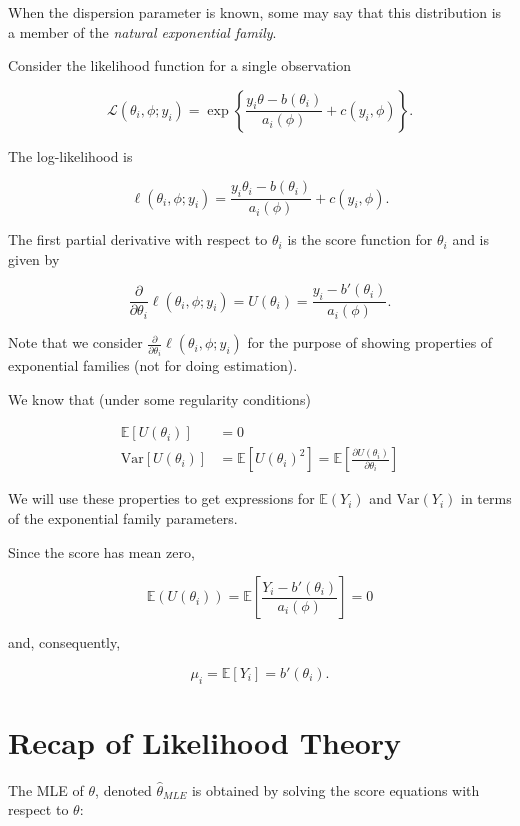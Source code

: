\documentclass[
  letterpaper,
  DIV=11,
  numbers=noendperiod]{scrreport}
\begin{document}
When the dispersion parameter is known, some may say that this
distribution is a member of the \emph{natural exponential family}.

Consider the likelihood function for a single observation

\[\mathcal L(\theta_i, \phi ; y_i) = \exp \left\{ \frac{y_i \theta - b(\theta_i)}{a_i(\phi)} + c(y_i, \phi) \right\}.\]

The log-likelihood is

\[\ell(\theta_i, \phi; y_i) = \frac{y_i \theta_i - b(\theta_i)}{a_i(\phi)} + c(y_i, \phi).\]

The first partial derivative with respect to \(\theta_i\) is the score
function for \(\theta_i\) and is given by

\[\frac{\partial}{\partial \theta_i} \ell (\theta_i, \phi; y_i) = U(\theta_i) = \frac{y_i - b'(\theta_i)}{a_i(\phi)}.\]

Note that we consider
\(\frac{\partial}{\partial \theta_i} \ell (\theta_i, \phi; y_i)\) for
the purpose of showing properties of exponential families (not for doing
estimation).

We know that (under some regularity conditions)

\[
\begin{aligned}
\mathbb E[U(\theta_i)] & = 0 \\ 
\text{Var}[U(\theta_i)] & = \mathbb E[U(\theta_i)^2] = \mathbb E\left[ \frac{\partial U(\theta_i)}{\partial \theta_i} \right]
\end{aligned}
\]

We will use these properties to get expressions for \(\mathbb E(Y_i)\)
and \(\text{Var}(Y_i)\) in terms of the exponential family parameters.

Since the score has mean zero,

\[\mathbb E(U(\theta_i)) = \mathbb E\left[ \frac{Y_i - b'(\theta_i)}{a_i(\phi)} \right] = 0 \]

and, consequently,

\[\mu_i = \mathbb E[Y_i] = b'(\theta_i).\]


\hypertarget{recap-of-likelihood-theory}{%
\chapter{Recap of Likelihood Theory}\label{recap-of-likelihood-theory}}

The MLE of \(\theta\), denoted \(\hat \theta_{MLE}\) is obtained by
solving the score equations with respect to \(\theta\):
\end{document}
